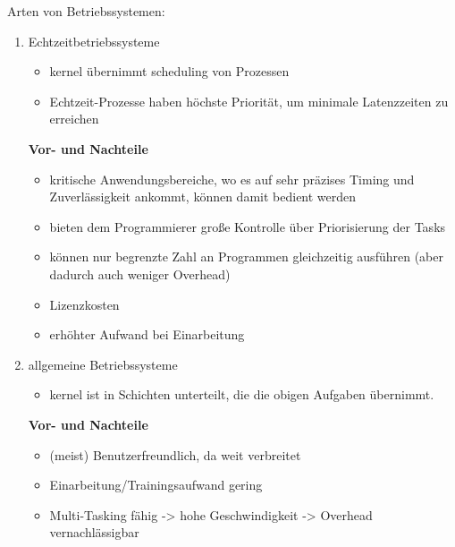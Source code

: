 Arten von Betriebssystemen:
\begin{enumerate}
  \item Echtzeitbetriebssysteme
  \begin{itemize}
    \item kernel übernimmt scheduling von Prozessen
    \item Echtzeit-Prozesse haben höchste Priorität, um minimale Latenzzeiten zu erreichen
  \end{itemize}
  \textbf{Vor- und Nachteile}\\
  \begin{minipage}[t]{0.45\textwidth}
    \begin{itemize}[label=\ensuremath{+}]
    \item kritische Anwendungsbereiche, wo es auf sehr präzises Timing und Zuverlässigkeit ankommt, können damit bedient werden
    \item bieten dem Programmierer große Kontrolle über Priorisierung der Tasks 
    \end{itemize}
    \end{minipage}
    \hfill
    \begin{minipage}[t]{0.45\textwidth}
    \begin{itemize}[label=\ensuremath{-}]
    \item können nur begrenzte Zahl an Programmen gleichzeitig ausführen (aber dadurch auch weniger Overhead)
    \item Lizenzkosten
    \item erhöhter Aufwand bei Einarbeitung
    \end{itemize}
  \end{minipage}
  \item allgemeine Betriebssysteme
    \begin{itemize}
      \item kernel ist in Schichten unterteilt, die die obigen Aufgaben übernimmt.
    \end{itemize}
    \textbf{Vor- und Nachteile}\\
    \begin{minipage}[t]{0.45\textwidth}
      \begin{itemize}[label=\ensuremath{+}]
      \item (meist) Benutzerfreundlich, da weit verbreitet
      \item Einarbeitung/Trainingsaufwand gering
      \item Multi-Tasking fähig -> hohe Geschwindigkeit -> Overhead vernachlässigbar
      \end{itemize}

\end{minipage}
\end{enumerate}
